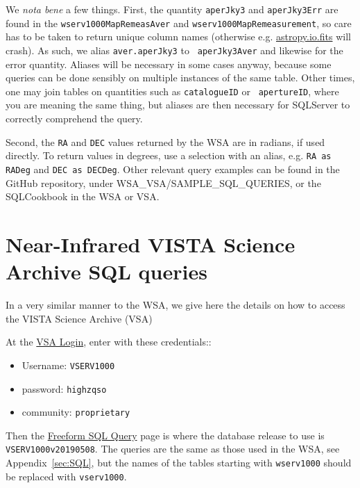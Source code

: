 \documentclass[usenatbib]{mnras}
\begin{document}
We {\it nota bene} a few things. First, the quantity {\tt aperJky3}
and {\tt aperJky3Err} are found in the {\tt wserv1000MapRemeasAver}
and {\tt wserv1000MapRemeasurement}, so care has to be taken to return
unique column names (otherwise e.g.
\href{http://docs.astropy.org/en/stable/io/fits/}{astropy.io.fits}
will crash).  As such, we alias {\tt aver.aperJky3} to {\tt
aperJky3Aver} and likewise for the error quantity. Aliases will be
necessary in some cases anyway, because some queries can be done
sensibly on multiple instances of the same table. Other times, one may
join tables on quantities such as {\tt catalogueID} or {\tt
apertureID}, where you are meaning the same thing, but aliases are then necessary 
for SQLServer to correctly comprehend the query. 

Second, the {\tt RA} and {\tt DEC} values returned by the WSA are in radians, if
used directly. To return values in degrees, use a selection with an alias, e.g. 
{\tt RA as RADeg} and {\tt DEC as DECDeg}. Other relevant query examples can be found in the
GitHub repository, under WSA\_VSA/SAMPLE\_SQL\_QUERIES, or the SQLCookbook in the WSA or VSA.

\onecolumn

\twocolumn


\section{Near-Infrared VISTA Science Archive SQL queries}\label{sec:SQL_VSA}
In a very similar manner to the WSA, we give here the details on how to access
the VISTA Science Archive (VSA)

At the \href{http://horus.roe.ac.uk/vsa/login.html}{VSA Login}, enter 
with these credentials::
\begin{itemize}
    \item Username: {\tt VSERV1000} 
    \item password: {\tt highzqso} 
    \item community: {\tt proprietary}
\end{itemize}
Then the \href{http://horus.roe.ac.uk:8080/vdfs/VSQL_form.jsp}{Freeform SQL
Query} page is where the database release to use is {\tt
VSERV1000v20190508}. The queries are the same as those used in the
WSA, see Appendix~\ref{sec:SQL}, but the names of the tables starting
with {\tt wserv1000} should be replaced with {\tt vserv1000}.







%
%


\end{document}
